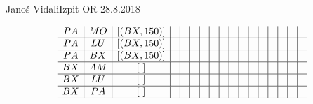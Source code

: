 \begin{naloga}{Janoš Vidali}{Izpit OR 28.8.2018}
\begin{odgovor}
\begin{tabela}
$$\begin{array}{c|c|c|c|c|c|c|c|c|c|c|c|c|c|c|c|c}
PA & MO & [(BX, 150)] &  & & & & & & & & & & & & & \\ \hline
PA & LU & [(BX, 150)] &  & & & & & & & & & & & & & \\ \hline
PA & BX & [(BX, 150)] &  & & & & & & & & & & & & & \\ \hline
BX & AM & [\ ] & & & & & & & & & & & & & & \\ \hline
BX & LU & [\ ] &  & & & & & & & & & & & & & \\ \hline
BX & PA & [\ ] &  & & & & & & & & & & & & & \\ \hline
\end{array}
$$
\end{tabela}




\end{odgovor}
\end{naloga}
